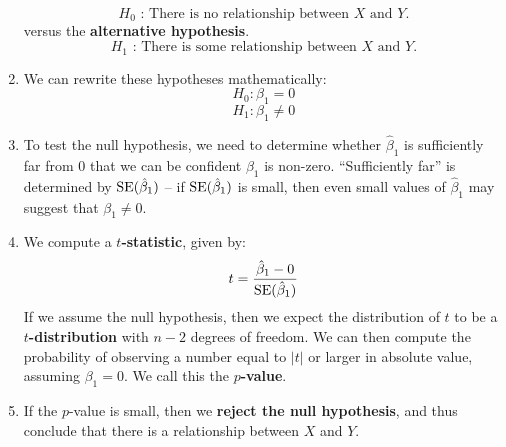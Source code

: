 \documentclass[10pt]{article}
\newcommand{\SE}{{\rm SE}}
\begin{document}
\begin{enumerate}
	$$H_0 \text{ : There is no relationship between $X$ and $Y$}.$$
	versus the \textbf{alternative hypothesis}.
	$$H_1 \text{ : There is some relationship between $X$ and $Y$}. $$
	\item We can rewrite these hypotheses mathematically:
	$$H_0 : \beta_1 = 0 $$
	$$H_1 : \beta_1 \neq 0$$
	\item To test the null hypothesis, we need to determine whether $\hat \beta_1$ is sufficiently far from 0 that we can be confident $\beta_1$ is non-zero.  ``Sufficiently far'' is determined by $\SE(\hat \beta_1)$ -- if $\SE(\hat \beta_1)$ is small, then even small values of $\hat \beta_1$ may suggest that $\beta_1 \neq 0$.  
	\item We compute a \textbf{$t$-statistic}, given by:
	$$ t = \dfrac{\hat \beta_1 - 0}{\SE(\hat \beta_1)} $$
	If we assume the null hypothesis, then we expect the distribution of $t$ to be a \textbf{$t$-distribution} with $n-2$ degrees of freedom.  We can then compute the probability of observing a number equal to $|t|$ or larger in absolute value, assuming $\beta_1 = 0$.  We call this the \textbf{$p$-value}.
	\item If the $p$-value is small, then we \textbf{reject the null hypothesis}, and thus conclude that there is a relationship between $X$ and $Y$.
\end{enumerate}

\vspace{.2in} 
\end{document}
